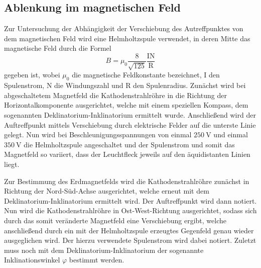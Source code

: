 \subsection{Ablenkung im magnetischen Feld}
Zur Untersuchung der Abhängigkeit der Verschiebung des Autreffpunktes von dem
magnetischen Feld wird eine Helmholtzspule verwendet, in deren Mitte das magnetische
Feld durch die Formel
\begin{equation}
  B = \mu_0 \frac{8}{\sqrt{125}}\frac{\text{I}\text{N}}{\text{R}}
  \label{eqn:helmholtz}
\end{equation}
gegeben ist, wobei $\mu_0 $ die magnetische Feldkonstante bezeichnet, I den Spulenstrom,
N die Windungszahl und R den Spulenradius.
Zunächst wird bei abgeschaltetem Magnetfeld
die Kathodenstrahlröhre in die Richtung der Horizontalkomponente ausgerichtet,
welche mit einem speziellen Kompass, dem sogenannten Deklinatorium-Inklinatorium ermittelt wurde.
Anschließend wird der Auftreffpunkt mittels Verschiebung durch elektrische Felder auf die
unterste Linie gelegt.
Nun wird bei Beschleunigungsspannungen von einmal $\SI{250}{\volt}$ und einmal $\SI{350}{\volt}$
die Helmholtzspule angeschaltet und der Spulenstrom und somit das Magnetfeld so
variiert, dass der Leuchtfleck jeweils auf den äquidistanten Linien liegt.


\noindent Zur Bestimmung des Erdmagnetfelds wird die Kathodenstrahlröhre zunächst
in Richtung der Nord-Süd-Achse ausgerichtet, welche erneut mit dem Deklinatorium-Inklinatorium
ermittelt wird. Der Auftreffpunkt wird dann notiert.
Nun wird die Kathodenstrahlröhre in Ost-West-Richtung ausgerichtet, sodass sich durch das
somit veränderte Magnetfeld eine Verschiebung ergibt, welche anschließend durch
ein mit der Helmholtzspule erzeugtes Gegenfeld genau wieder ausgeglichen wird.
Der hierzu verwendete Spulenstrom wird dabei notiert. Zuletzt muss noch mit dem
Deklinatorium-Inklinatorium der sogenannte Inklinationswinkel $\varphi$ bestimmt
werden.
